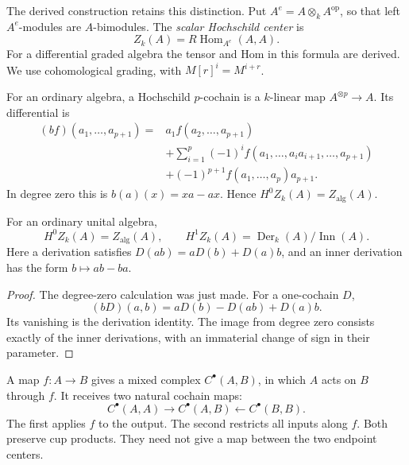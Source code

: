 The derived construction retains this distinction. Put
$A^e=A\otimes_k A^{\mathrm{op}}$, so that left $A^e$-modules
are $A$-bimodules. The \emph{scalar Hochschild center} is
\begin{equation}\label{v4-arith:centers:eq:scalar}
 Z_k(A)=R\operatorname{Hom}_{A^e}(A,A).
\end{equation}
For a differential graded algebra the tensor and Hom in this
formula are derived. We use cohomological grading, with
$M[r]^i=M^{i+r}$.

For an ordinary algebra, a Hochschild $p$-cochain is a
$k$-linear map $A^{\otimes p}\to A$. Its differential is
\begin{equation}\label{v4-arith:centers:eq:hoch-differential}
 \begin{split}
 (bf)(a_1,\ldots,a_{p+1})={}&
 a_1f(a_2,\ldots,a_{p+1})\\
 &+\sum_{i=1}^p(-1)^i
 f(a_1,\ldots,a_ia_{i+1},\ldots,a_{p+1})\\
 &+(-1)^{p+1}f(a_1,\ldots,a_p)a_{p+1}.
 \end{split}
\end{equation}
In degree zero this is $b(a)(x)=xa-ax$. Hence
$H^0Z_k(A)=Z_{\mathrm{alg}}(A)$.

\begin{proposition}
\label{v4-arith:centers:prop:low}
For an ordinary unital algebra,
\[
 H^0Z_k(A)=Z_{\mathrm{alg}}(A),\qquad
 H^1Z_k(A)=\operatorname{Der}_k(A)/\operatorname{Inn}(A).
\]
Here a derivation satisfies $D(ab)=aD(b)+D(a)b$, and an
inner derivation has the form $b\mapsto ab-ba$.
\end{proposition}

\begin{proof}
The degree-zero calculation was just made. For a one-cochain $D$,
\[
 (bD)(a,b)=aD(b)-D(ab)+D(a)b.
\]
Its vanishing is the derivation identity. The image from degree
zero consists exactly of the inner derivations, with an immaterial
change of sign in their parameter.
\end{proof}

A map $f:A\to B$ gives a mixed complex
$C^\bullet(A,B)$, in which $A$ acts on $B$ through $f$.
It receives two natural cochain maps:
\begin{equation}\label{v4-arith:centers:eq:mixed}
 C^\bullet(A,A)\longrightarrow C^\bullet(A,B)
 \longleftarrow C^\bullet(B,B).
\end{equation}
The first applies $f$ to the output. The second restricts all
inputs along $f$. Both preserve cup products. They need not
give a map between the two endpoint centers.


